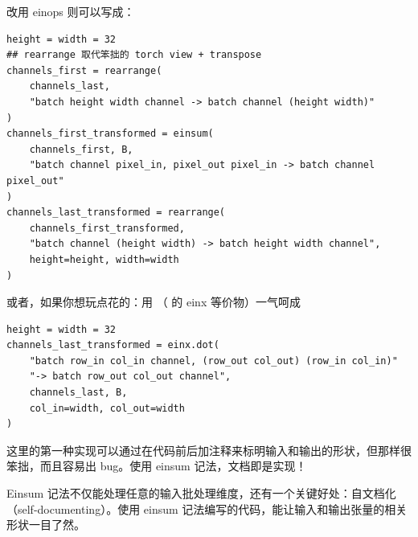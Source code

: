 改用 einops 则可以写成：

\begin{lstlisting}
height = width = 32
## rearrange 取代笨拙的 torch view + transpose
channels_first = rearrange(
    channels_last,
    "batch height width channel -> batch channel (height width)"
)
channels_first_transformed = einsum(
    channels_first, B,
    "batch channel pixel_in, pixel_out pixel_in -> batch channel pixel_out"
)
channels_last_transformed = rearrange(
    channels_first_transformed,
    "batch channel (height width) -> batch height width channel",
    height=height, width=width
)
\end{lstlisting}

或者，如果你想玩点花的：用 （ 的 einx 等价物）一气呵成

\begin{lstlisting}
height = width = 32
channels_last_transformed = einx.dot(
    "batch row_in col_in channel, (row_out col_out) (row_in col_in)"
    "-> batch row_out col_out channel",
    channels_last, B,
    col_in=width, col_out=width
)
\end{lstlisting}

这里的第一种实现可以通过在代码前后加注释来标明输入和输出的形状，但那样很笨拙，而且容易出 bug。使用 einsum 记法，文档即是实现！

Einsum 记法不仅能处理任意的输入批处理维度，还有一个关键好处：自文档化（self-documenting）。使用 einsum 记法编写的代码，能让输入和输出张量的相关形状一目了然。
